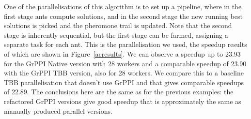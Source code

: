 One of the parallelisations of this algorithm is to set up a pipeline, where in the first stage ants compute solutions, and in the second stage the new running best solutions is picked and the pheromone trail is updated. Note that the second stage is inherently sequential, but the first stage can be farmed, assigning a separate task for each ant. This is the parallelisation we used, the speedup results of which are shown in Figure~\ref{acresults}. We can observe a speedup up to 23.93 for the GrPPI Native version with 28 workers and a comparable speedup of 23.90
with the GrPPI TBB version, also for 28 workers. We compare this to a baseline TBB parallelisation that doesn't use GrPPI and that gives comparable speedups of 22.89. The conclusions here are the same as for the previous examples: the refactored GrPPI versions give good speedup that is approximately the same as manually produced parallel versions.


